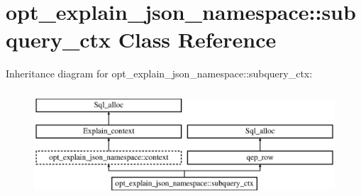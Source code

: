 \hypertarget{classopt__explain__json__namespace_1_1subquery__ctx}{}\section{opt\+\_\+explain\+\_\+json\+\_\+namespace\+:\+:subquery\+\_\+ctx Class Reference}
\label{classopt__explain__json__namespace_1_1subquery__ctx}
Inheritance diagram for opt\+\_\+explain\+\_\+json\+\_\+namespace\+:\+:subquery\+\_\+ctx\+:\begin{figure}[H]
\begin{center}
\leavevmode
\includegraphics[height=4.000000cm]{classopt__explain__json__namespace_1_1subquery__ctx}
\end{center}
\end{figure}
